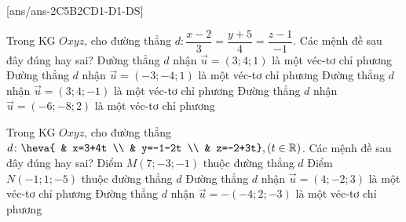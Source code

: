 \TNTF
{}[ans/ans-2C5B2CD1-D1-DS]
\begin{ex}%
	Trong KG $Oxyz$, cho đường thẳng $d \colon \dfrac{x-2}{3}=\dfrac{y+5}{4}=\dfrac{z-1}{-1}$.  Các mệnh đề sau đây đúng hay sai?
\choiceTF
{ Đường thẳng $d$ nhận $\overrightarrow{u}=\left( 3;4;1 \right)$ là một véc-tơ chỉ phương}
{ \True Đường thẳng $d$ nhận $\overrightarrow{u}=\left( -3;-4;1 \right)$ là một véc-tơ chỉ phương}
{\True  Đường thẳng $d$ nhận $\overrightarrow{u}=\left( 3;4;-1 \right)$ là một véc-tơ chỉ phương}
{ \True Đường thẳng $d$ nhận $\overrightarrow{u}=\left( -6;-8;2 \right)$ là một véc-tơ chỉ phương}
\end{ex}
\begin{ex}%
	Trong KG $Oxyz$, cho đường thẳng $d\colon \heva{
		& x=3+4t \\ 
		& y=-1-2t \\ 
		& z=-2+3t},( t\in \mathbb{R})$. Các mệnh đề sau đây đúng hay sai?
	\choiceTF
	{ Điểm $M\left( 7;-3;-1 \right)$ thuộc đường thẳng $d$}
	{ \True Điểm $N\left( -1;1;-5 \right)$ thuộc đường thẳng $d$}
	{\True  Đường thẳng $d$ nhận $\overrightarrow{u}=\left( 4;-2;3 \right)$ là một véc-tơ chỉ phương}
	{\True  Đường thẳng $d$ nhận $\overrightarrow{u}=-\left( -4;2;-3 \right)$ là một véc-tơ chỉ phương}
\end{ex}
